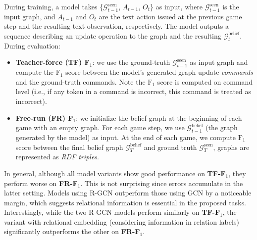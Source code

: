 \documentclass{article}
\newcommand{\tf}{\textbf{TF-F$_1$}\xspace}
\newcommand{\fr}{\textbf{FR-F$_1$}\xspace}
\begin{document}
During training, a model takes \{$\mathcal{G}^\text{seen}_{t-1}$, $A_{t-1}$, $O_t$\} as input, where $\mathcal{G}^\text{seen}_{t-1}$ is the input graph, and $A_{t-1}$ and $O_t$ are the text action issued at the previous game step and the resulting text observation, respectively. The model outputs a sequence describing an update operation to the graph and the resulting $\mathcal{G}^\text{belief}_{t}$.
During evaluation: 
\begin{itemize}
    \item \textbf{Teacher-force (TF) \textbf{F$_1$}}: we use the ground-truth $\mathcal{G}^\text{seen}_{t-1}$ as input graph and compute the $\text{F}_1$ score between the model's generated graph update \textit{commands} and the ground-truth commands. Note the $\text{F}_1$ score is computed on command level (i.e., if any token in a command is incorrect, this command is treated as incorrect).
    \item \textbf{Free-run (FR) \textbf{F$_1$}}: we initialize the belief graph at the beginning of each game with an empty graph. For each game step, we use $\mathcal{G}^\text{belief}_{t-1}$ (the graph generated by the model) as input. At the end of each game, we compute $\text{F}_1$ score between the final belief graph $\mathcal{G}^\text{belief}_{T}$ and ground truth $\mathcal{G}^\text{seen}_{T}$, graphs are represented as \textit{RDF triples}.
\end{itemize}


In general, although all model variants show good performance on \tf, they perform worse on \fr. This is not surprising since errors accumulate in the latter setting.
Models using R-GCN outperform those using GCN by a noticeable margin, which suggests relational information is essential in the proposed tasks.
Interestingly, while the two R-GCN models perform similarly on \tf, the variant with relational embedding (considering information in relation labels) significantly outperforms the other on \fr.
\end{document}
